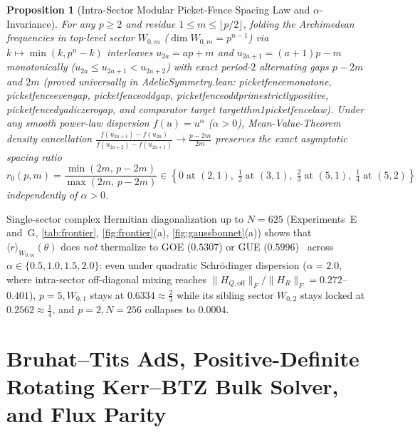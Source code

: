 \documentclass[11pt,a4paper]{article}
\numberwithin{equation}{section}
\theoremstyle{plain}
\newtheorem{proposition}[theorem]{Proposition}
\theoremstyle{definition}
\theoremstyle{remark}
\newcommand{\code}[1]{{\ttfamily\footnotesize\def\_{\textunderscore\penalty0\hskip0pt}#1}}
\begin{document}
\begin{proposition}[Intra-Sector Modular Picket-Fence Spacing Law and $\alpha$-Invariance]
\label{prop:picket}
For any $p \ge 2$ and residue $1 \le m \le \lfloor p/2 \rfloor$, folding the Archimedean frequencies in top-level sector $W_{0, m}$ ($\dim W_{0,m} = p^{n-1}$) via $k \mapsto \min(k, p^n - k)$ interleaves $u_{2a} = a p + m$ and $u_{2a+1} = (a+1)p - m$ monotonically ($u_{2a} \le u_{2a+1} < u_{2a+2}$) with exact period-$2$ alternating gaps $p - 2m$ and $2m$ (proved universally in \code{AdelicSymmetry.lean}: \code{picket\_fence\_monotone}, \code{picket\_fence\_even\_gap}, \code{picket\_fence\_odd\_gap}, \code{picket\_fence\_odd\_prime\_strictly\_positive}, \code{picket\_fence\_dyadic\_zero\_gap}, and comparator target \code{target\_thm1\_picket\_fence\_law}). Under any smooth power-law dispersion $f(u) = u^\alpha$ ($\alpha > 0$), Mean-Value-Theorem density cancellation $\frac{f(u_{2a+1}) - f(u_{2a})}{f(u_{2a+2}) - f(u_{2a+1})} \to \frac{p-2m}{2m}$ preserves the exact asymptotic spacing ratio
\begin{equation}
  r_0(p, m) = \frac{\min(2m,\, p - 2m)}{\max(2m,\, p - 2m)}
  \in \left\{0\;\text{at }(2,1),\; \tfrac{1}{2}\;\text{at }(3,1),\; \tfrac{2}{3}\;\text{at }(5,1),\; \tfrac{1}{4}\;\text{at }(5,2)\right\}
  \label{eq:picket}
\end{equation}
independently of $\alpha > 0$.
\end{proposition}

Single-sector complex Hermitian diagonalization up to $N = 625$ (Experiments~E and~G, \cref{tab:frontier}, \cref{fig:frontier}(a), \cref{fig:gaussbonnet}(a)) shows that $\langle r \rangle_{W_{0,m}}(\theta)$ does \emph{not} thermalize to GOE ($0.5307$) or GUE ($0.5996$)~\cite{Atas2013} across $\alpha \in \{0.5, 1.0, 1.5, 2.0\}$: even under quadratic Schr\"odinger dispersion ($\alpha = 2.0$, where intra-sector off-diagonal mixing reaches $\|H_{Q,\mathrm{off}}\|_F/\|H_R\|_F = 0.272$--$0.401$), $p=5, W_{0,1}$ stays at $0.6334 \approx \frac{2}{3}$ while its sibling sector $W_{0,2}$ stays locked at $0.2562 \approx \frac{1}{4}$, and $p=2, N=256$ collapses to $0.0004$.

\section[Bruhat--Tits AdS and Rotating Kerr--BTZ Bulk Solver]{Bruhat--Tits AdS, Positive-Definite Rotating Kerr--BTZ Bulk Solver, and Flux Parity}
\label{sec:bulk}
\end{document}
